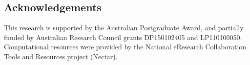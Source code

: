 \documentclass[compsoc]{IEEEtran}
\theoremstyle{plain}
\theoremstyle{definition}
\begin{document}
\subsection{Acknowledgements}
This research is supported by the Australian Postgraduate
Award, and partially funded by Australian Research Council grants
DP150102405 and LP110100050. Computational resources were provided by the National eResearch Collaboration Tools and Resources project (Nectar).

%
\printbibliography
\end{document}
